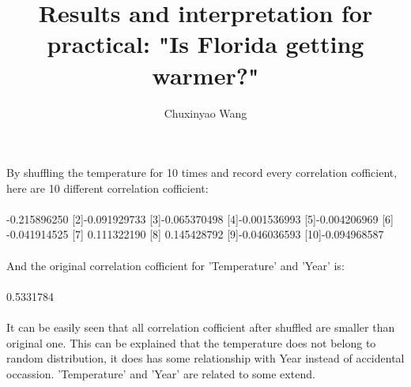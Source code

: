 \documentclass[12pt]{article}
\title{Results and interpretation for practical: "Is Florida getting warmer?"}
\author{Chuxinyao Wang}
\date{}
\begin{document}
  \maketitle
  
  \begin{results}
    By shuffling the temperature for 10 times and record every correlation cofficient, here are 10 different correlation cofficient:  
    \\ \hspace*{\fill} \\
    [1] -0.215896250 [2]-0.091929733 [3]-0.065370498 [4]-0.001536993 [5]-0.004206969
    [6] -0.041914525 [7] 0.111322190 [8] 0.145428792 [9]-0.046036593 [10]-0.094968587
    \\ \hspace*{\fill} \\
    And the original correlation cofficient for 'Temperature' and 'Year' is: 
    \\ \hspace*{\fill} \\
    [1] 0.5331784
    \\ \hspace*{\fill} \\
    It can be easily seen that all correlation cofficient after shuffled are smaller than original one. This can be explained that the temperature does not belong to random distribution, 
    it does has some relationship with Year instead of accidental occassion. 'Temperature' and 'Year' are related to some extend.
  \end{results}
 
\end{document}
